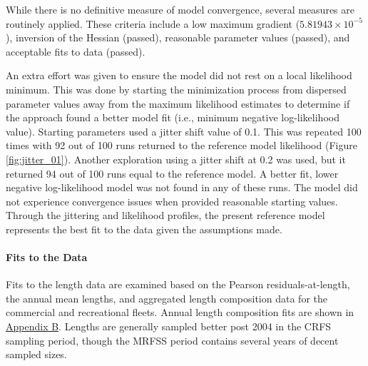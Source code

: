 \documentclass[11pt,
  english,
  a4paper,
]{article}
\begin{document}
While there is no definitive measure of model convergence, several measures are routinely applied. These criteria include a low maximum gradient (\ensuremath{5.81943\times 10^{-5}}), inversion of the Hessian (passed), reasonable parameter values (passed), and acceptable fits to data (passed).

\leavevmode\tagmcend\tagstructend\par


An extra effort was given to ensure the model did not rest on a local likelihood minimum. This was done by starting the minimization process from dispersed parameter values away from the maximum likelihood estimates to determine if the approach found a better model fit (i.e., minimum negative log-likelihood value). Starting parameters used a jitter shift value of 0.1. This was repeated 100 times with 92 out of 100 runs returned to the reference model likelihood (Figure \ref{fig:jitter_01}). Another exploration using a jitter shift at 0.2 was used, but it returned 94 out of 100 runs equal to the reference model. A better fit, lower negative log-likelihood model was not found in any of these runs. The model did not experience convergence issues when provided reasonable starting values. Through the jittering and likelihood profiles, the present reference model represents the best fit to the data given the assumptions made.

\leavevmode\tagmcend\tagstructend\par


\hypertarget{fits-to-the-data}{%
\paragraph{Fits to the Data}\label{fits-to-the-data}}

\leavevmode\tagmcend\tagstructend


Fits to the length data are examined based on the Pearson residuals-at-length, the annual mean lengths, and aggregated length composition data for the commercial and recreational fleets. Annual length composition fits are shown in {\protect\hyperlink{append_a}{Appendix B}\leavevmode\tagmcend\tagstructend}. Lengths are generally sampled better post 2004 in the CRFS sampling period, though the MRFSS period contains several years of decent sampled sizes.
\end{document}
